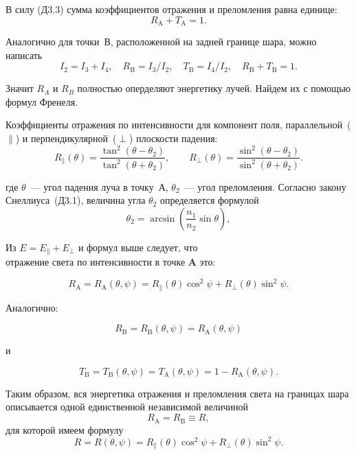 \documentclass[a4paper]{article}
\begin{document}
В силу (Д3.3) сумма коэффициентов отражения и преломления равна единице:
\[
R_{\mathrm{A}} + T_{\mathrm{A}} = 1.
\]

Аналогично для точки~В, расположенной на задней границе шара, можно написать
\[
I_2 = I_3 + I_4, \quad R_{\mathrm{B}} = I_3/I_2, \quad T_{\mathrm{B}} = I_4/I_2, \quad R_{\mathrm{B}} + T_{\mathrm{B}} = 1.
\]

Значит $R_{A}$ и $R_{B}$ полностью оперделяют энергетику лучей. Найдем их с помощью формул Френеля.

Коэффициенты отражения по интенсивности для компонент поля, параллельной~($\parallel$) и перпендикулярной~($\perp$) плоскости падения:
\begin{equation}
    R_{\parallel}(\theta) = \frac{\tan^2(\theta - \theta_2)}{\tan^2(\theta + \theta_2)}, \qquad 
    R_{\perp}(\theta) = \frac{\sin^2(\theta - \theta_2)}{\sin^2(\theta + \theta_2)}. \tag{7}
\end{equation}

где $\theta$~--- угол падения луча в точку~А, $\theta_2$~--- угол преломления. Согласно закону Снеллиуса~(Д3.1), величина угла $\theta_2$ определяется формулой
\begin{equation}
    \theta_2 = \arcsin \left( \frac{n_1}{n_2} \sin \theta \right), \tag{8}
\end{equation}

Из $E = E_{\parallel } + E_{\perp }$ и формул выше следует, что $\textbf{отражение света по интенсивности в точке A}$ это:

\begin{equation}
    R_{\mathrm{A}} = R_{\mathrm{A}}(\theta, \psi) = R_{\parallel}(\theta) \cos^2 \psi + R_{\perp}(\theta) \sin^2 \psi. \tag{9}
\end{equation}

Аналогично:

\[
R_{\mathrm{B}} = R_{\mathrm{B}}(\theta, \psi) = R_{\mathrm{A}}(\theta, \psi)
\]

и 

\begin{equation}
T_{\mathrm{B}} = T_{\mathrm{B}}(\theta, \psi) = T_{\mathrm{A}}(\theta, \psi) = 1 - R_{\mathrm{A}}(\theta, \psi). \tag{10}
\end{equation}

Таким образом, вся энергетика отражения и преломления света на границах шара описывается одной единственной независимой величиной
\[
R_{\mathrm{A}} = R_{\mathrm{B}} \equiv R,
\]
для которой имеем формулу
\begin{equation}
    R = R(\theta, \psi) = R_{\parallel}(\theta) \cos^2 \psi + R_{\perp}(\theta) \sin^2 \psi. \tag{11}
\end{equation}
\end{document}
